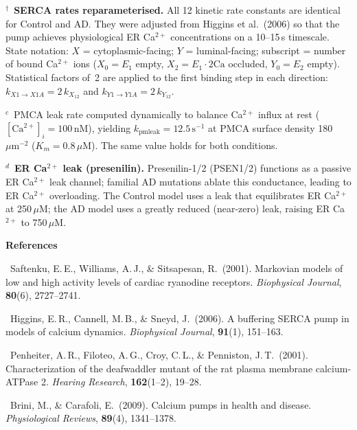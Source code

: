 \documentclass[11pt]{article}
\begin{document}
\medskip
\noindent$^{\dagger}$\ \textbf{SERCA rates reparameterised.}
All 12 kinetic rate constants are identical for Control and AD.
They were adjusted from Higgins et al.\ (2006) so that the pump
achieves physiological ER Ca$^{2+}$ concentrations on a 10--15\,s
timescale.
State notation: $X$ = cytoplasmic-facing; $Y$ = luminal-facing;
subscript = number of bound Ca$^{2+}$ ions
($X_0 = E_1$ empty, $X_2 = E_1\cdot2\mathrm{Ca}$ occluded,
$Y_0 = E_2$ empty).
Statistical factors of~2 are applied to the first binding step in each
direction: $k_{X1\to X1A}=2\,k_{X_{12}}$ and $k_{Y1\to Y1A}=2\,k_{Y_{12}}$.

\medskip
\noindent$^{c}$\ PMCA leak rate computed dynamically to balance
Ca$^{2+}$ influx at rest ($[\mathrm{Ca}^{2+}]_i=100\,\mathrm{nM}$),
yielding $k_\mathrm{pmleak}=12.5\,\mathrm{s}^{-1}$ at PMCA surface
density 180\,$\mu\mathrm{m}^{-2}$ ($K_m=0.8\,\mu\mathrm{M}$).
The same value holds for both conditions.

\medskip
\noindent$^{d}$\ \textbf{ER Ca$^{2+}$ leak (presenilin).}
Presenilin-1/2 (PSEN1/2) functions as a passive ER Ca$^{2+}$ leak
channel; familial AD mutations ablate this conductance, leading to
ER Ca$^{2+}$ overloading.
The Control model uses a leak that equilibrates ER Ca$^{2+}$ at
250\,$\mu$M; the AD model uses a greatly reduced (near-zero) leak,
raising ER Ca$^{2+}$ to 750\,$\mu$M.

\bigskip
\noindent\textbf{References}\vspace{4pt}

\noindent[1]\ Saftenku, E.\,E., Williams, A.\,J., \& Sitsapesan, R.\ (2001).
Markovian models of low and high activity levels of cardiac ryanodine
receptors.
\textit{Biophysical Journal}, \textbf{80}(6), 2727--2741.

\smallskip
\noindent[2]\ Higgins, E.\,R., Cannell, M.\,B., \& Sneyd, J.\ (2006).
A buffering SERCA pump in models of calcium dynamics.
\textit{Biophysical Journal}, \textbf{91}(1), 151--163.

\smallskip
\noindent[3]\ Penheiter, A.\,R., Filoteo, A.\,G., Croy, C.\,L., \&
Penniston, J.\,T.\ (2001).
Characterization of the deafwaddler mutant of the rat plasma membrane
calcium-ATPase 2.
\textit{Hearing Research}, \textbf{162}(1--2), 19--28.

\smallskip
\noindent[4]\ Brini, M., \& Carafoli, E.\ (2009).
Calcium pumps in health and disease.
\textit{Physiological Reviews}, \textbf{89}(4), 1341--1378.
\end{document}

